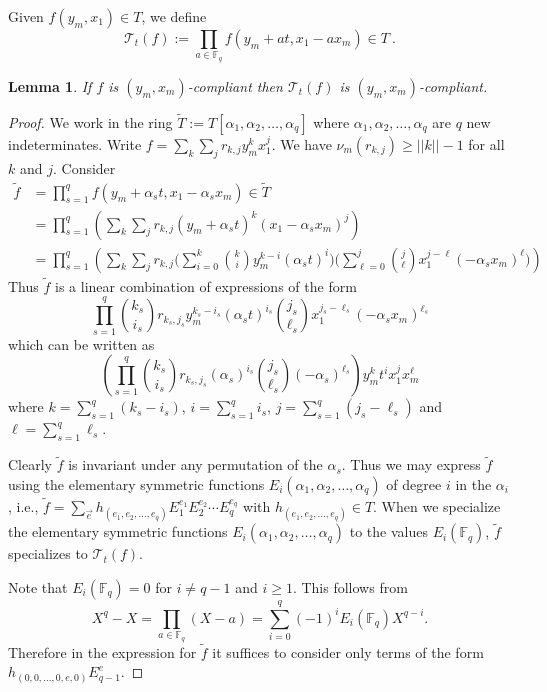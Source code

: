 \documentclass{amsart}
\newcommand{\field}{\mathbb{F}}
\newcommand{\T}{\mathcal{T}}
\newcommand{\binomial}[2]{\genfrac{(}{)}{0pt}{}{#1}{#2}}
\newtheorem{lem}[subsection]{Lemma}
\begin{document}
Given $f(y_m,x_1)\in T$, we define
 $$\T_t(f) :=\prod_{a \in \field_q} f(y_m+a t,x_1-a x_m)\in T\ .$$


  \begin{lem}\label{orthcompl}
    If $f$ is $(y_m,x_m)$-compliant then $\T_t(f)$ is $(y_m,x_m)$-compliant.
  \end{lem}
\begin{proof}
   We work in the ring $\widetilde{T} := T[\alpha_1,\alpha_2,\dots,\alpha_q]$ where $\alpha_1,\alpha_2,\dots,\alpha_q$ are $q$ new indeterminates.
   Write $f=\sum_k \sum_j r_{k,j} y_m^k x_1^j$.  We have $\nu_m(r_{k,j}) \geq ||k||-1$ for all $k$ and $j$.
   Consider
   \begin{align*}
   \widetilde{f} &=\prod_{s=1}^q  f(y_m+\alpha_s t, x_1- \alpha_s  x_m)\in \widetilde{T}\\
    &= \prod_{s=1}^q \left(\sum_k \sum_j r_{k,j}(y_m+\alpha_s t)^k (x_1-\alpha_s  x_m)^j \right)\\
    &= \prod_{s=1}^q  \left(\sum_k \sum_j r_{k,j}\bigg(\sum_{i=0}^k \binomial{k}{i} y_m^{k-i} (\alpha_s t)^i \bigg)\bigg(\sum_{\ell=0}^j \binomial{j}{\ell} x_1^{j-\ell} (- \alpha_s x_m)^\ell \bigg)\right)
   \end{align*}
   Thus $\widetilde{f}$ is a linear combination of expressions of the form
   $$\prod_{s=1}^q \binomial{k_s}{i_s} r_{k_s,j_s} y_m^{k_s-i_s}(\alpha_s t)^{i_s}  \binomial{j_s}{\ell_s} x_1^{j_s-\ell_s}(-\alpha_s  x_m)^{\ell_s}$$
   which can be written as
 $$  \left(\prod_{s=1}^q \binomial{k_s}{i_s} r_{k_s,j_s} (\alpha_s)^{i_s}  \binomial{j_s}{\ell_s} (-\alpha_s)^{\ell_s} \right) y_m^k t^i x_1^j x_m^\ell
   $$ where $k=\sum_{s=1}^q (k_s-i_s)$, $i=\sum_{s=1}^q i_s$, $j=\sum_{s=1}^q (j_s-\ell_s)$ and $\ell=\sum_{s=1}^q \ell_s$.  

   Clearly $\widetilde{f}$ is invariant under any permutation of the $\alpha_s$.   Thus we may express 
   $\widetilde{f}$ using the elementary symmetric functions $E_i(\alpha_1,\alpha_2,\dots,\alpha_q)$ of degree $i$ 
   in the $\alpha_i$, i.e.,
   $\widetilde{f}=\sum_{\vec{e}} h_{(e_1,e_2,\dots,e_q)} E_1^{e_1} E_2^{e_2} \cdots  E_q^{e_q}$ with
   $h_{(e_1,e_2,\dots,e_q)} \in T$.  When we specialize the elementary symmetric functions $E_i(\alpha_1,\alpha_2,\dots,\alpha_q)$ to the values $E_i(\field_q)$, $\widetilde{f}$ specializes to $\T_t(f)$.
   
   Note that $E_i(\field_q)=0$ for $i \neq q-1$ and $i \geq 1$.  This follows from  
   $$X^q-X = \prod_{a\in \field_q} (X-a)= \sum_{i=0}^q (-1)^{i} E_i(\field_q) X^{q-i}.$$
Therefore in the expression for $\widetilde{f}$ it suffices to consider only terms of the form
   $h_{(0,0,\dots,0,e,0)}E_{q-1}^e$.  
   

\end{proof}
\end{document}
